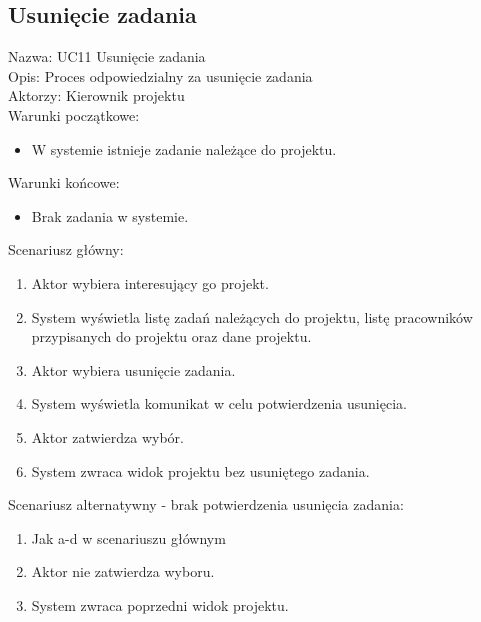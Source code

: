 \subsection{Usunięcie zadania}
Nazwa: UC11 Usunięcie zadania\\
Opis: Proces odpowiedzialny za usunięcie zadania\\
Aktorzy: Kierownik projektu \\
Warunki początkowe:
\begin{itemize}
\item W systemie istnieje zadanie należące do projektu.
\end{itemize}
Warunki końcowe:
\begin{itemize}
\item Brak zadania w systemie.
\end{itemize}
Scenariusz główny:
\begin{enumerate}
\item Aktor wybiera interesujący go projekt.
\item System wyświetla listę zadań należących do projektu, listę pracowników przypisanych do projektu oraz dane projektu.
\item Aktor wybiera usunięcie zadania.
\item System wyświetla komunikat w celu potwierdzenia usunięcia.
\item Aktor zatwierdza wybór.
\item System zwraca widok projektu bez usuniętego zadania.
\end{enumerate}
Scenariusz alternatywny - brak potwierdzenia usunięcia zadania: 
\begin{enumerate}
\item Jak a-d w scenariuszu głównym
\item Aktor nie zatwierdza wyboru.
\item System zwraca poprzedni widok projektu.
\end{enumerate}

